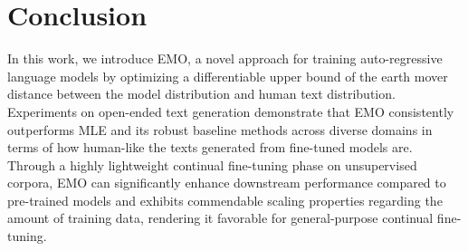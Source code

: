 \section{Conclusion}
In this work, we introduce EMO, a novel approach for training auto-regressive language models by optimizing a differentiable upper bound of the earth mover distance between the model distribution and human text distribution. Experiments on open-ended text generation demonstrate that EMO consistently outperforms MLE and its robust baseline methods across diverse domains in terms of how human-like the texts generated from fine-tuned models are. 
Through a highly lightweight continual fine-tuning phase on unsupervised corpora, EMO can significantly enhance downstream performance compared to pre-trained models and exhibits commendable scaling properties regarding the amount of training data, rendering it favorable for general-purpose continual fine-tuning.